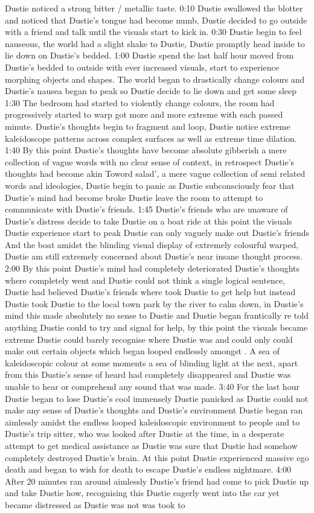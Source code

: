 \documentclass[12pt]{book}
\begin{document}
Dustie noticed a strong bitter / metallic taste. 0:10 Dustie swallowed the blotter and noticed that Dustie's tongue had become numb, Dustie decided to go outside with a friend and talk until the visuals start to kick in. 0:30 Dustie begin to feel nauseous, the world had a slight shake to Dustie, Dustie promptly head inside to lie down on Dustie's bedded. 1:00 Dustie spend the last half hour moved from Dustie's bedded to outside with ever increased visuals, start to experience morphing objects and shapes. The world began to drastically change colours and Dustie's nausea began to peak so Dustie decide to lie down and get some sleep 1:30 The bedroom had started to violently change colours, the room had progressively started to warp got more and more extreme with each passed minute. Dustie's thoughts begin to fragment and loop, Dustie notice extreme kaleidoscope patterns across complex surfaces as well as extreme time dilation. 1:40 By this point Dustie's thoughts have become absolute gibberish a mere collection of vague words with no clear sense of context, in retrospect Dustie's thoughts had become akin Toword salad', a mere vague collection of semi related words and ideologies, Dustie begin to panic as Dustie subconsciously fear that Dustie's mind had become broke Dustie leave the room to attempt to communicate with Dustie's friends. 1:45 Dustie's friends who are unaware of Dustie's distress decide to take Dustie on a boat ride at this point the visuals Dustie experience start to peak Dustie can only vaguely make out Dustie's friends And the boat amidst the blinding visual display of extremely colourful warped, Dustie am still extremely concerned about Dustie's near insane thought process. 2:00 By this point Dustie's mind had completely deteriorated Dustie's thoughts where completely went and Dustie could not think a single logical sentence, Dustie had believed Dustie's friends where took Dustie to get help but instead Dustie took Dustie to the local town park by the river to calm down, in Dustie's mind this made absolutely no sense to Dustie and Dustie began frantically re told anything Dustie could to try and signal for help, by this point the visuals became extreme Dustie could barely recognise where Dustie was and could only could make out certain objects which began looped endlessly amongst . A sea of kaleidoscopic colour at some moments a sea of blinding light at the next, apart from this Dustie's sense of heard had completely disappeared and Dustie was unable to hear or comprehend any sound that was made. 3:40 For the last hour Dustie began to lose Dustie's cool immensely Dustie panicked as Dustie could not make any sense of Dustie's thoughts and Dustie's environment Dustie began ran aimlessly amidst the endless looped kaleidoscopic environment to people and to Dustie's trip sitter, who was looked after Dustie at the time, in a desperate attempt to get medical assistance as Dustie was sure that Dustie had somehow completely destroyed Dustie's brain. At this point Dustie experienced massive ego death and began to wish for death to escape Dustie's endless nightmare. 4:00 After 20 minutes ran around aimlessly Dustie's friend had come to pick Dustie up and take Dustie how, recognising this Dustie eagerly went into the car yet became distressed as Dustie was not was took to 
\end{document}
